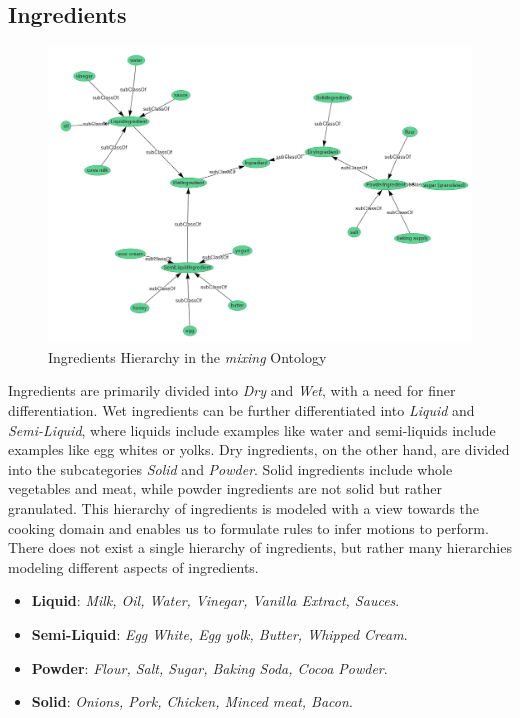 \subsection{Ingredients}

\begin{figure}[H]
    \includegraphics[scale=0.45]{Graphics/classHierarchy/ingredients_hierarchy.png}
    \centering
    \caption{Ingredients Hierarchy in the \textit{mixing} Ontology}
\end{figure}

Ingredients are primarily divided into \textit{Dry} and \textit{Wet}, with a need for finer differentiation.
Wet ingredients can be further differentiated into \textit{Liquid} and \textit{Semi-Liquid}, where liquids include examples like water and semi-liquids include examples like egg whites or yolks. 
Dry ingredients, on the other hand, are divided into the subcategories \textit{Solid} and \textit{Powder}. 
Solid ingredients include whole vegetables and meat, while powder ingredients are not solid but rather granulated. 
This hierarchy of ingredients is modeled with a view towards the cooking domain and enables us to formulate rules to infer motions to perform. 
There does not exist a single hierarchy of ingredients, but rather many hierarchies modeling different aspects of ingredients.

\begin{itemize}
    \item \textbf{Liquid}: \textit{Milk, Oil, Water, Vinegar, Vanilla Extract, Sauces}.
    \item \textbf{Semi-Liquid}: \textit{Egg White, Egg yolk, Butter, Whipped Cream}.
    \item \textbf{Powder}: \textit{Flour, Salt, Sugar, Baking Soda, Cocoa Powder}.
    \item \textbf{Solid}: \textit{Onions, Pork, Chicken, Minced meat, Bacon}.
  \end{itemize}

